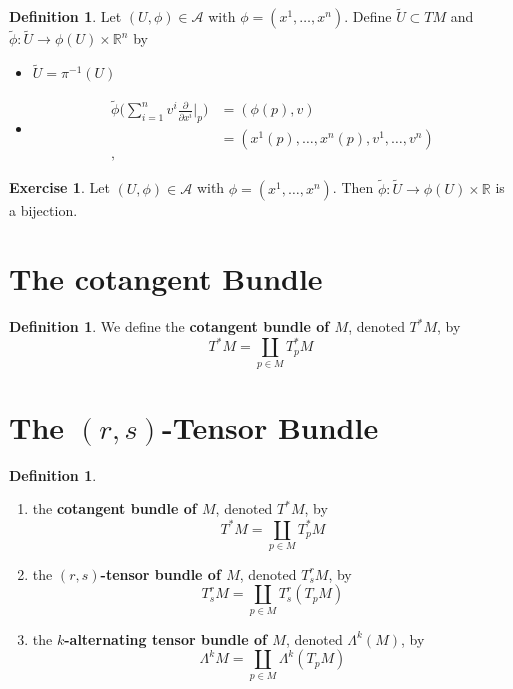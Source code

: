 \documentclass{book}
\theoremstyle{definition}
\newtheorem{defn}[definition]{Definition}
\newtheorem{ex}[definition]{Exercise}
\newcommand{\Lam}{\Lambda}
\newcommand{\R}{\mathbb{R}}
\newcommand{\MA}{\mathcal{A}}
\newcommand{\tU}{\tilde{U}}
\newcommand{\tphi}{\tilde{\phi}}
\DeclareMathOperator*{\0}{\mbf{0}}
\DeclareMathOperator*{\1}{\mbf{1}}
\newcommand{\p}{\partial}
\begin{document}
	\begin{defn}
		Let $(U, \phi) \in \MA$ with $\phi = (x^1, \dots, x^n)$. Define $\tilde{U} \subset TM$ and $\tilde{\phi}: \tilde{U} \rightarrow \phi(U) \times \R^{n}$ by  
		\begin{itemize}
			\item $\tU = \pi^{-1}(U)$
			\item 
			\begin{align*}
				\tphi \bigg(\sum\limits_{i =1}^n v^i \frac{\p}{\p x^i} \bigg|_p \bigg) 
				&= (\phi(p), v) \\
				&= (x^1(p), \dots, x^n(p), v^1, \dots, v^n) \\
, 			\end{align*}
		\end{itemize}
	\end{defn}

	\begin{ex}
		Let $(U, \phi) \in \MA$ with $\phi = (x^1, \dots, x^n)$. Then $\tphi:\tU \rightarrow \phi(U) \times \R$ is a bijection. 
	\end{ex}














	\newpage
	\section{The cotangent Bundle}
	
	\begin{defn}
		We define the \textbf{cotangent bundle of $M$}, denoted $T^*M$, by 
		$$T^*M = \coprod_{p \in M} T_p^*M$$ 
	\end{defn}





	
	
	
	
	
	
	
	
	
	
	\section{The $(r,s)$-Tensor Bundle}
	
	\begin{defn}
	\begin{enumerate}
		\item the \textbf{cotangent bundle of $M$}, denoted $T^*M$, by 
		$$T^*M = \coprod_{p \in M} T_p^*M$$
		\item the \textbf{$(r,s)$-tensor bundle of $M$}, denoted $T^r_sM$, by
	$$T^r_s M = \coprod_{p \in M} T^r_s(T_p M)$$
	\item the \textbf{$k$-alternating tensor bundle of $M$}, denoted $\Lam^k(M)$, by
	$$\Lam^kM = \coprod_{p \in M} \Lam^k(T_pM)$$
		\end{enumerate}
	\end{defn}
	
\end{document}

